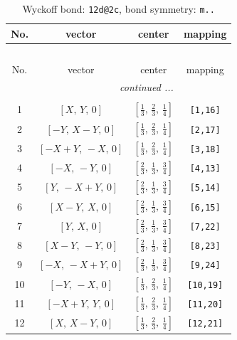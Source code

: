 \documentclass[fleqn,8pt]{jsarticle}
\begin{document}
\begin{longtable}{cccc}
\caption{Wyckoff bond: {\tt 12d@2c}, bond symmetry: {\tt m..}}
 \\
 \hline \hline
No. & vector & center & mapping \\ \hline \endfirsthead

\multicolumn{3}{l}{\tablename\ \thetable{}} \\
 \hline \hline
No. & vector & center & mapping \\ \hline \endhead

 \hline \hline
\multicolumn{3}{r}{\footnotesize\it continued ...} \\ \endfoot

 \hline \hline
\multicolumn{3}{r}{} \\ \endlastfoot

1 & $\left[ X,\, Y,\, 0 \right]$ & $\left[ \frac{1}{3},\, \frac{2}{3},\, \frac{1}{4} \right]$ & {\tt [1,16]} \\ \hline
2 & $\left[ - Y,\, X - Y,\, 0 \right]$ & $\left[ \frac{1}{3},\, \frac{2}{3},\, \frac{1}{4} \right]$ & {\tt [2,17]} \\ \hline
3 & $\left[ - X + Y,\, - X,\, 0 \right]$ & $\left[ \frac{1}{3},\, \frac{2}{3},\, \frac{1}{4} \right]$ & {\tt [3,18]} \\ \hline
4 & $\left[ - X,\, - Y,\, 0 \right]$ & $\left[ \frac{2}{3},\, \frac{1}{3},\, \frac{3}{4} \right]$ & {\tt [4,13]} \\ \hline
5 & $\left[ Y,\, - X + Y,\, 0 \right]$ & $\left[ \frac{2}{3},\, \frac{1}{3},\, \frac{3}{4} \right]$ & {\tt [5,14]} \\ \hline
6 & $\left[ X - Y,\, X,\, 0 \right]$ & $\left[ \frac{2}{3},\, \frac{1}{3},\, \frac{3}{4} \right]$ & {\tt [6,15]} \\ \hline
7 & $\left[ Y,\, X,\, 0 \right]$ & $\left[ \frac{2}{3},\, \frac{1}{3},\, \frac{3}{4} \right]$ & {\tt [7,22]} \\ \hline
8 & $\left[ X - Y,\, - Y,\, 0 \right]$ & $\left[ \frac{2}{3},\, \frac{1}{3},\, \frac{3}{4} \right]$ & {\tt [8,23]} \\ \hline
9 & $\left[ - X,\, - X + Y,\, 0 \right]$ & $\left[ \frac{2}{3},\, \frac{1}{3},\, \frac{3}{4} \right]$ & {\tt [9,24]} \\ \hline
10 & $\left[ - Y,\, - X,\, 0 \right]$ & $\left[ \frac{1}{3},\, \frac{2}{3},\, \frac{1}{4} \right]$ & {\tt [10,19]} \\ \hline
11 & $\left[ - X + Y,\, Y,\, 0 \right]$ & $\left[ \frac{1}{3},\, \frac{2}{3},\, \frac{1}{4} \right]$ & {\tt [11,20]} \\ \hline
12 & $\left[ X,\, X - Y,\, 0 \right]$ & $\left[ \frac{1}{3},\, \frac{2}{3},\, \frac{1}{4} \right]$ & {\tt [12,21]} \\
\end{longtable}
\end{document}
